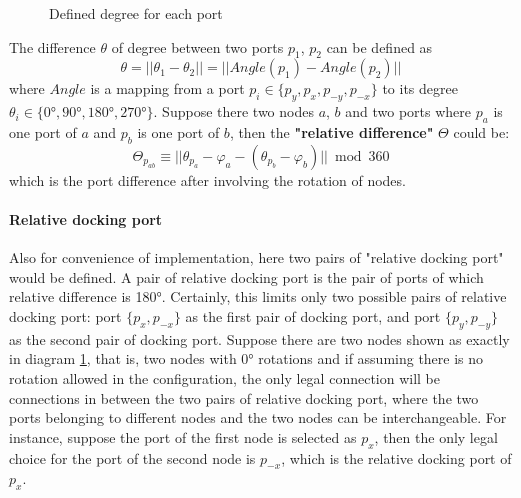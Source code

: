 \par\noindent
\begin{figure}[H]
\begin{center}
\end{center}

\caption{Defined degree for each port}
\label{standardR}
\end{figure}

\par\noindent
The difference $\theta$ of degree between two ports $p_{1}$, $p_{2}$ can be defined as
$$ \theta = ||\theta_{1} - \theta_{2}|| = ||Angle(p_{1}) - Angle(p_{2})||$$
where $Angle$ is a mapping from a port $p_{i} \in \{ p_{y}, p_{x}, p_{-y}, p_{-x}\}$
to its degree $\theta_{i} \in \{\ang{0},\ang{90},\ang{180},\ang{270}\}$.
Suppose there two nodes $a$, $b$ and two ports where $p_{a}$ is
one port of $a$ and $p_{b}$ is one port of $b$, then the \textbf{"relative difference"} $\Theta$ could be:
\begin{equation} \label{Equ_port_differ}
\Theta_{p_{ab}} \equiv ||\theta_{p_{a}} - \varphi_{a} - (\theta_{p_{b}} - \varphi_{b})|| \bmod 360
\end{equation}
which is the port difference after involving the rotation of nodes.

\paragraph{Relative docking port \label{dockerport}}
Also for convenience of implementation, here two pairs of "relative docking port" would
be defined. A pair of relative docking port is the pair of ports of which relative
difference is \ang{180}. Certainly, this limits only two possible pairs of
relative docking port: port $\{p_{x}, p_{-x}\}$ as the first pair of docking port,
and port $\{p_{y}, p_{-y}\}$ as the second pair of docking port. Suppose there are
two nodes shown as exactly in diagram \ref{standardR}, that is, two nodes with \ang{0}
rotations and if assuming there is no rotation allowed in the configuration, the only legal connection will
be connections in between the two pairs of relative docking port,
where the two ports belonging to different nodes and the two nodes can be interchangeable.
For instance, suppose the port of the first node is selected as $p_{x}$, then the only legal
choice for the port of the second node is $p_{-x}$, which is the relative docking port of $p_{x}$.


